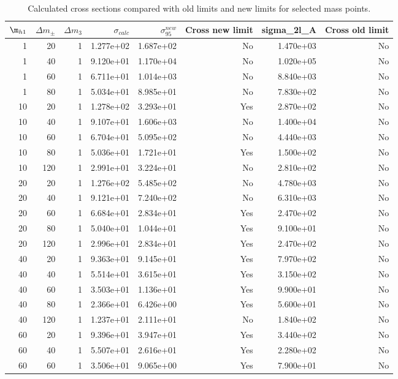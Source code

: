 \begin{table}
    \caption{Calculated cross sections compared with old limits and new limits for selected mass points.}
    \label{tab:cross_section_limits}
\begin{tabular}{rrrrrrrr}
\toprule
$\m_{h1}$ & $\Delta m_\pm$ & $\Delta m_3$ & $\sigma_{calc}$ & $\sigma^{new}_{95}$ & Cross new limit & sigma_2l_A & Cross old limit \\\midrule
1 & 20 & 1 & 1.277e+02 & 1.687e+02 & No & 1.470e+03 & No \\
1 & 40 & 1 & 9.120e+01 & 1.170e+04 & No & 1.020e+05 & No \\
1 & 60 & 1 & 6.711e+01 & 1.014e+03 & No & 8.840e+03 & No \\
1 & 80 & 1 & 5.034e+01 & 8.985e+01 & No & 7.830e+02 & No \\
10 & 20 & 1 & 1.278e+02 & 3.293e+01 & Yes & 2.870e+02 & No \\
10 & 40 & 1 & 9.107e+01 & 1.606e+03 & No & 1.400e+04 & No \\
10 & 60 & 1 & 6.704e+01 & 5.095e+02 & No & 4.440e+03 & No \\
10 & 80 & 1 & 5.036e+01 & 1.721e+01 & Yes & 1.500e+02 & No \\
10 & 120 & 1 & 2.991e+01 & 3.224e+01 & No & 2.810e+02 & No \\
20 & 20 & 1 & 1.276e+02 & 5.485e+02 & No & 4.780e+03 & No \\
20 & 40 & 1 & 9.121e+01 & 7.240e+02 & No & 6.310e+03 & No \\
20 & 60 & 1 & 6.684e+01 & 2.834e+01 & Yes & 2.470e+02 & No \\
20 & 80 & 1 & 5.040e+01 & 1.044e+01 & Yes & 9.100e+01 & No \\
20 & 120 & 1 & 2.996e+01 & 2.834e+01 & Yes & 2.470e+02 & No \\
40 & 20 & 1 & 9.363e+01 & 9.145e+01 & Yes & 7.970e+02 & No \\
40 & 40 & 1 & 5.514e+01 & 3.615e+01 & Yes & 3.150e+02 & No \\
40 & 60 & 1 & 3.503e+01 & 1.136e+01 & Yes & 9.900e+01 & No \\
40 & 80 & 1 & 2.366e+01 & 6.426e+00 & Yes & 5.600e+01 & No \\
40 & 120 & 1 & 1.237e+01 & 2.111e+01 & No & 1.840e+02 & No \\
60 & 20 & 1 & 9.396e+01 & 3.947e+01 & Yes & 3.440e+02 & No \\
60 & 40 & 1 & 5.507e+01 & 2.616e+01 & Yes & 2.280e+02 & No \\
60 & 60 & 1 & 3.506e+01 & 9.065e+00 & Yes & 7.900e+01 & No \\

\end{tabular}
\end{table}
